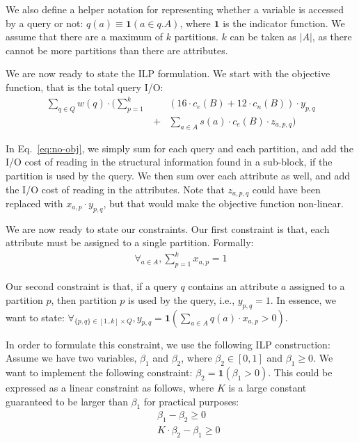 We also define a helper notation for representing whether a variable is
accessed by a query or not: $q(a)\equiv \mathbf{1}(a \in q.A)$, where
$\mathbf{1}$ is the indicator function. We assume that there are a maximum of
$k$ partitions. $k$ can be taken as $|A|$, as there cannot be more partitions
than there are attributes.

We are now ready to state the ILP formulation. We start with the objective
function, that is the total query I/O:
\begin{eqnarray}
\sum_{q\in Q} w(q) \cdot \Big(\sum_{p=1}^{k} \!\!&&\!\! (16\cdot c_e(B) + 12\cdot c_n(B))\cdot
y_{p,q}\nonumber\\ 
&+& \sum_{a\in A} s(a)\cdot c_e(B)\cdot z_{a,p,q}\Big)\label{eq:no-obj}
\end{eqnarray}

In Eq.~\ref{eq:no-obj}, we simply sum for each query and each partition, and
add the I/O cost of reading in the structural information found in a
sub-block, if the partition is used by the query. We then sum over each
attribute as well, and add the I/O cost of reading in the attributes. Note
that $z_{a,p,q}$ could have been  replaced with $x_{a,p}\cdot y_{p,q}$, but
that would make the objective function non-linear. 

We are now ready to state our constraints. Our first constraint is that, each
attribute must be assigned to a single partition. Formally:
\begin{eqnarray}
\forall_{a\in A}, \sum_{p=1}^{k} x_{a,p} = 1
\end{eqnarray}

Our second constraint is that, if a query $q$ contains an attribute $a$
assigned to a partition $p$, then partition $p$ is used by the query, i.e.,
$y_{p,q}=1$. In essence, we want to state: $\forall_{\{p,q\}\in [1..k]\times
Q}, y_{p,q} = \mathbf{1}(\sum_{a\in A} q(a)\cdot x_{a,p}>0)$. 

In order to formulate this constraint, we use the following ILP  construction:
Assume we have two variables, $\beta_1$ and $\beta_2$, where $\beta_2\in[0,1]$
and $\beta_1\geq 0$. We want to implement the following constraint: $\beta_2 =
\mathbf{1}(\beta_1 > 0)$. This could be expressed as a linear constraint as
follows, where $K$ is a large constant guaranteed to be larger than $\beta_1$
for practical purposes:
\begin{eqnarray}
&& \beta_1 - \beta_2 \geq 0\nonumber\\
&& K\cdot\beta_2 - \beta_1 \geq 0\label{eq:beta-ilp}
\end{eqnarray}


